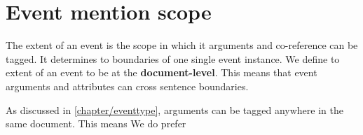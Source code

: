 \section{Event mention scope}

The extent of an event is the scope in which it arguments and co-reference can be tagged.
It determines to boundaries of one single event instance.
We define to extent of an event to be at the \textbf{document-level}.
This means that event arguments and attributes can cross sentence boundaries.

As discussed in \ref{chapter/eventtype}, arguments can be tagged anywhere in the same document.
This means 
We do prefer 

